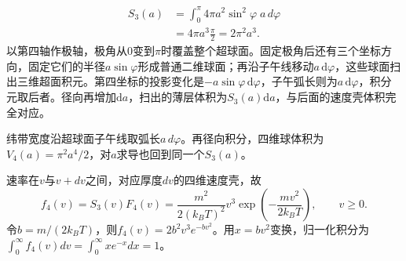 \documentclass[UTF8,fontset=fandol,a4paper,11pt]{ctexart}
\begin{document}
\[
\begin{aligned}
S_3(a)&=\int_0^\pi
4\pi a^2\sin^2\varphi\;a\,d\varphi\\
&=4\pi a^3\frac{\pi}{2}
=\boxed{2\pi^2a^3}.
\end{aligned}
\]
以第四轴作极轴，极角从0变到$\pi$时覆盖整个超球面。固定极角后还有三个坐标方向，固定它们的半径$a\sin\varphi$形成普通二维球面；再沿子午线移动$a\,\mathrm d\varphi$，这些球面扫出三维超面积元。第四坐标的投影变化是$-a\sin\varphi\,\mathrm d\varphi$，子午弧长则为$a\,\mathrm d\varphi$，积分元取后者。径向再增加$\mathrm da$，扫出的薄层体积为$S_3(a)\mathrm da$，与后面的速度壳体积完全对应。

纬带宽度沿超球面子午线取弧长$a\,d\varphi$。再径向积分，四维球体积为$V_4(a)=\pi^2a^4/2$，对$a$求导也回到同一个$S_3(a)$。

速率在$v$与$v+dv$之间，对应厚度$dv$的四维速度壳，故
\[
\boxed{f_4(v)=S_3(v)F_4(v)
=\frac{m^2}{2(k_BT)^2}v^3
\exp\left(-\frac{mv^2}{2k_BT}\right)},\qquad v\geq0.
\]
令$b=m/(2k_BT)$，则$f_4(v)=2b^2v^3e^{-bv^2}$。用$x=bv^2$变换，归一化积分为
$\int_0^\infty f_4(v)dv=\int_0^\infty xe^{-x}dx=1$。
\end{document}

